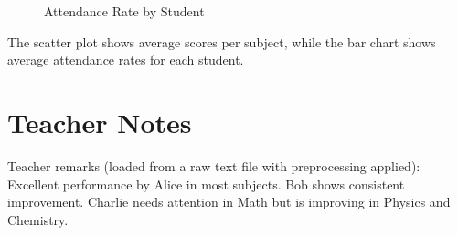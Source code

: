 \documentclass[11pt]{report}
\begin{document}
\dataA

\begin{figure}[H]
  \centering
    \plot{\dataA}
  \vspace{1em}
  \centering
  \caption{ Attendance Rate by Student }
\end{figure}

The scatter plot shows average scores per subject, while the bar chart shows average attendance rates for each student.

\section{Teacher Notes}

Teacher remarks (loaded from a raw text file with preprocessing applied): Excellent performance by Alice in most subjects. Bob shows consistent improvement. Charlie needs attention in Math but is improving in Physics and Chemistry.
\end{document}
